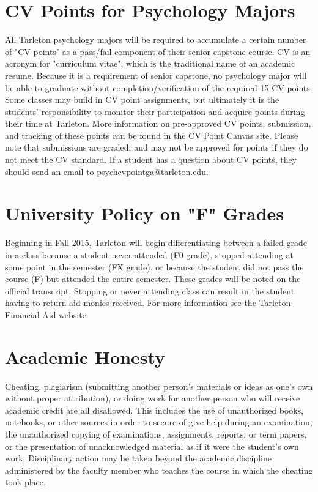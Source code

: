 \documentclass[10pt]{article}
\begin{document}
\section*{CV Points for Psychology Majors}
\label{sec:orgedff30d}
All Tarleton psychology majors will be required to accumulate a certain number of "CV points" as a pass/fail component of their senior capstone course. CV is an acronym for "curriculum vitae", which is the traditional name of an academic resume. Because it is a requirement of senior capstone, no psychology major will be able to graduate without completion/verification of the required 15 CV points. Some classes may build in CV point assignments, but ultimately it is the students’ responsibility to monitor their participation and acquire points during their time at Tarleton. More information on pre-approved CV points, submission, and tracking of these points can be found in the CV Point Canvas site. Please note that submissions are graded, and may not be approved for points if they do not meet the CV standard.  If a student has a question about CV points, they should send an email to psychcvpointga@tarleton.edu.

\section*{University Policy on "F" Grades}
\label{sec:org6093666}
Beginning in Fall 2015, Tarleton will begin differentiating between a 
failed grade in a class because a student never attended (F0 grade), 
stopped attending at some point in the semester (FX grade), or because 
the student did not pass the course (F) but attended the entire semester. 
These grades will be noted on the official transcript. Stopping or never 
attending class can result in the student having to return aid monies 
received.  For more information see the Tarleton Financial Aid website.

\section*{Academic Honesty}
\label{sec:org389e8b2}

Cheating, plagiarism (submitting another person’s materials or ideas as one’s own without proper attribution), or doing work for another person who will receive academic credit are all disallowed. This includes the use of unauthorized books, notebooks, or other sources in order to secure of give help during an examination, the unauthorized copying of examinations, assignments, reports, or term papers, or the presentation of unacknowledged material as if it were the student’s own work. Disciplinary action may be taken beyond the academic discipline administered by the faculty member who teaches the course in which the cheating took place.
\end{document}
